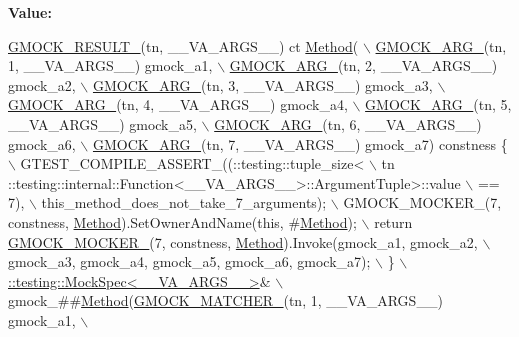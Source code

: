 {\bfseries Value\+:}
\begin{DoxyCode}
\hyperlink{gmock-generated-function-mockers_8h_a0e9d94e9c77df84f1103af06feee1077}{GMOCK\_RESULT\_}(tn, \_\_VA\_ARGS\_\_) ct \hyperlink{gmock-spec-builders__test_8cc_a95606368148f3e5aab5db46c32466afd}{Method}( \(\backslash\)
      \hyperlink{gmock-generated-function-mockers_8h_a887575cc1c31158fba808180a10c004f}{GMOCK\_ARG\_}(tn, 1, \_\_VA\_ARGS\_\_) gmock\_a1, \(\backslash\)
      \hyperlink{gmock-generated-function-mockers_8h_a887575cc1c31158fba808180a10c004f}{GMOCK\_ARG\_}(tn, 2, \_\_VA\_ARGS\_\_) gmock\_a2, \(\backslash\)
      \hyperlink{gmock-generated-function-mockers_8h_a887575cc1c31158fba808180a10c004f}{GMOCK\_ARG\_}(tn, 3, \_\_VA\_ARGS\_\_) gmock\_a3, \(\backslash\)
      \hyperlink{gmock-generated-function-mockers_8h_a887575cc1c31158fba808180a10c004f}{GMOCK\_ARG\_}(tn, 4, \_\_VA\_ARGS\_\_) gmock\_a4, \(\backslash\)
      \hyperlink{gmock-generated-function-mockers_8h_a887575cc1c31158fba808180a10c004f}{GMOCK\_ARG\_}(tn, 5, \_\_VA\_ARGS\_\_) gmock\_a5, \(\backslash\)
      \hyperlink{gmock-generated-function-mockers_8h_a887575cc1c31158fba808180a10c004f}{GMOCK\_ARG\_}(tn, 6, \_\_VA\_ARGS\_\_) gmock\_a6, \(\backslash\)
      \hyperlink{gmock-generated-function-mockers_8h_a887575cc1c31158fba808180a10c004f}{GMOCK\_ARG\_}(tn, 7, \_\_VA\_ARGS\_\_) gmock\_a7) constness \{ \(\backslash\)
    GTEST\_COMPILE\_ASSERT\_((::testing::tuple\_size<                          \(\backslash\)
        tn ::testing::internal::Function<\_\_VA\_ARGS\_\_>::ArgumentTuple>::value \(\backslash\)
            == 7), \(\backslash\)
        this\_method\_does\_not\_take\_7\_arguments); \(\backslash\)
    GMOCK\_MOCKER\_(7, constness, \hyperlink{gmock-spec-builders__test_8cc_a95606368148f3e5aab5db46c32466afd}{Method}).SetOwnerAndName(\textcolor{keyword}{this}, #\hyperlink{gmock-spec-builders__test_8cc_a95606368148f3e5aab5db46c32466afd}{Method}); \(\backslash\)
    return \hyperlink{gmock-generated-function-mockers_8h_a7d362499e27b1bc3a9806dd3cf58a5b7}{GMOCK\_MOCKER\_}(7, constness, \hyperlink{gmock-spec-builders__test_8cc_a95606368148f3e5aab5db46c32466afd}{Method}).Invoke(gmock\_a1, gmock\_a2, \(\backslash\)
        gmock\_a3, gmock\_a4, gmock\_a5, gmock\_a6, gmock\_a7); \(\backslash\)
  \} \(\backslash\)
  \hyperlink{classtesting_1_1internal_1_1_mock_spec}{::testing::MockSpec<\_\_VA\_ARGS\_\_>}& \(\backslash\)
      gmock\_##\hyperlink{gmock-spec-builders__test_8cc_a95606368148f3e5aab5db46c32466afd}{Method}(\hyperlink{gmock-generated-function-mockers_8h_aa87d0009fe91f1c89d658776b55a769c}{GMOCK\_MATCHER\_}(tn, 1, \_\_VA\_ARGS\_\_) gmock\_a1, \(\backslash\)

\end{DoxyCode}
